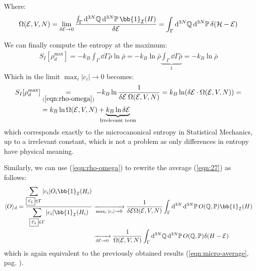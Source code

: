 \documentclass[../../main.tex]{subfiles}
\begin{document}
Where:
\begin{align*}
    \Omega(\mathcal{E}, V, N) = \lim_{\delta \mathcal{E}\to 0} \frac{\int_{\Gamma} \dd[3N]{\mathbb{Q}} \dd[3N]{\mathbb{P}} \bb{1}_{\mathcal{I}}(H)}{\delta \mathcal{E}} = \int_{\Gamma} \dd[3N]{\mathbb{Q}} \dd[3N]{\mathbb{P}} \delta(\mathcal{H}- \mathcal{E}) 
\end{align*}

We can finally compute the entropy at the maximum:
\begin{align}
    S_I[\rho^{\max}_d] =
    -k_B\int_{\Gamma}\dd{\Gamma} \bar{\rho} \ln \bar{\rho} = - k_B \ln \bar{\rho} \underbrace{\int_{\Gamma} \dd{\Gamma} \bar{\rho}}_{1}  =
    -k_B \ln \bar{\rho} 
\end{align}
Which in the limit $\max_i |c_i| \to 0$ becomes:
\begin{align*}
    S_{I}[\rho_d^{\max}] &\underset{(\ref{eqn:rho-omega})}{=} - k_B \ln \frac{1}{\delta \mathcal{E}\>  \Omega(\mathcal{E}, V, N)}   = k_B \ln( \delta \mathcal{E} \cdot \Omega(\mathcal{E}, V, N)) =\\
    &= k_B \ln \Omega(\mathcal{E}, V, N) + \underbrace{k_B \ln \delta \mathcal{E}}_{\mathclap{\text{Irrelevant term}}} 
\end{align*}
which corresponds exactly to the microcanonical entropy in Statistical Mechanics, up to a irrelevant constant, which is not a problem as only differences in entropy have physical meaning.

\medskip

Similarly, we can use (\ref{eqn:rho-omega}) to rewrite the average (\ref{eqn:27}) as follows:
\begin{align}
    \label{eqn:32}
    \langle O \rangle_d = \frac{\displaystyle \sum_{\boxed{c_i} \in \Gamma} |c_i| O_i \bb{1}_{\mathcal{I}}(H_i)}{\displaystyle \sum_{\boxed{c_i} \in \Gamma}|c_i| \bb{1}_{\mathcal{I}}(H_i)} & \xrightarrow[\max_i |c_i| \to 0]{} \frac{1}{\delta \mathcal{E}\Omega(\mathcal{E}, V, N)}  \int_{\Gamma} \dd[3N] \dd[3N]{\mathbb{P}} O(\mathbb{Q}, \mathbb{P}) \bb{1}_{\mathcal{I}}(H)\\
    &  \xrightarrow[\delta \mathcal{E} \to 0]{} \frac{1}{\Omega(\mathcal{E}, V, N)}  \int_{\Gamma} \dd[3N]{\mathbb{Q}} \dd[3N]{\mathbb{P}} O(\mathbb{Q}, \mathbb{P}) \delta(H - \mathcal{E})
\end{align}
which is again equivalent to the previously obtained results (\ref{eqn:micro-average}, pag. \pageref{eqn:micro-average}).
\end{document}
